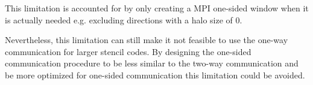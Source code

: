 This limitation is accounted for by only creating a MPI one-sided window when it is actually needed e.g. excluding directions with a halo size of 0.

Nevertheless, this limitation can still make it not feasible to use the one-way communication for larger stencil codes.
By designing the one-sided communication procedure to be less similar to the two-way communication and be more optimized for one-sided communication this limitation could be avoided.

